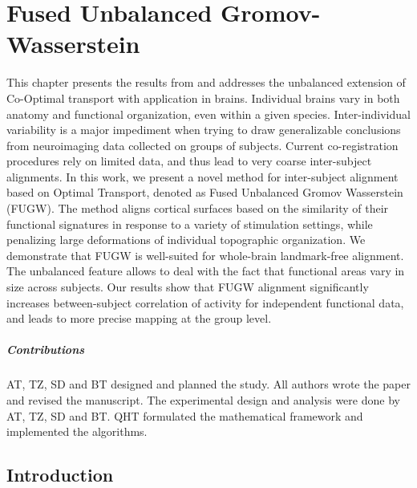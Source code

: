 
\chapter{Fused Unbalanced Gromov-Wasserstein} \label{chap:fugw}

\renewcommand{\contentsname}{Contents}
\localtableofcontents*
{}

\hfill \break
This chapter presents the results from \citep{Thual22} and addresses the unbalanced extension
of Co-Optimal transport with application in brains.
Individual brains vary in both anatomy and functional organization, even within a given species.
Inter-individual variability is a major impediment when trying to draw generalizable conclusions
from neuroimaging data collected on groups of subjects.
Current co-registration procedures rely on limited data, and thus lead to very coarse
inter-subject alignments.
In this work, we present a novel method for inter-subject alignment based on Optimal Transport,
denoted as Fused Unbalanced Gromov Wasserstein (FUGW).
The method aligns cortical surfaces based on the similarity of their functional signatures in
response to a variety of stimulation settings, while penalizing large deformations of
individual topographic organization.
We demonstrate that FUGW is well-suited for whole-brain landmark-free alignment.
The unbalanced feature allows to deal with the fact that functional areas
vary in size across subjects. Our results show that FUGW alignment significantly
increases between-subject correlation of activity for independent functional data,
and leads to more precise mapping at the group level.

\paragraph{Contributions} AT, TZ, SD and BT designed and planned the study. All authors wrote
the paper and revised the manuscript. The experimental design and analysis were done
by AT, TZ, SD and BT. QHT formulated the mathematical framework and implemented the algorithms.

\raggedbottom

\section{Introduction}
\label{sec:introduction}

